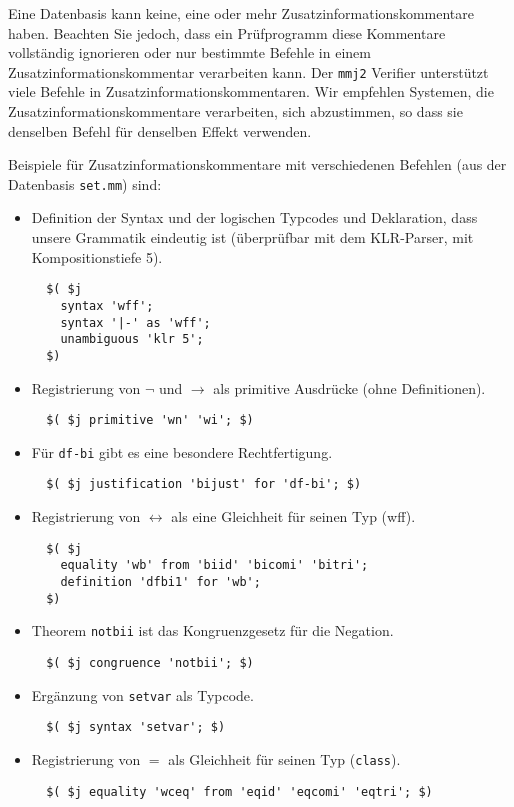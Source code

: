 Eine Datenbasis kann keine, eine oder mehr Zusatzinformationskommentare haben. Beachten Sie jedoch, dass ein Prüfprogramm diese Kommentare vollständig ignorieren oder nur bestimmte Befehle in einem Zusatzinformationskommentar verarbeiten kann. Der \texttt{mmj2} Verifier unterstützt viele Befehle in Zusatzinformationskommentaren. Wir empfehlen Systemen, die Zusatzinformationskommentare verarbeiten, sich abzustimmen, so dass sie denselben Befehl für denselben Effekt verwenden.

Beispiele für Zusatzinformationskommentare mit verschiedenen Befehlen (aus der Datenbasis \texttt{set.mm}) sind:

\begin{itemize}
   \item Definition der Syntax und der logischen Typcodes und Deklaration, dass unsere Grammatik eindeutig ist (überprüfbar mit dem KLR-Parser, mit Kompositionstiefe 5).
\begin{verbatim}
  $( $j
    syntax 'wff';
    syntax '|-' as 'wff';
    unambiguous 'klr 5';
  $)
\end{verbatim}

   \item Registrierung von $\lnot$ und $\rightarrow$ als primitive Ausdrücke (ohne Definitionen).
\begin{verbatim}
  $( $j primitive 'wn' 'wi'; $)
\end{verbatim}

   \item Für \texttt{df-bi} gibt es eine besondere Rechtfertigung.
\begin{verbatim}
  $( $j justification 'bijust' for 'df-bi'; $)
\end{verbatim}

   \item Registrierung von $\leftrightarrow$ als eine Gleichheit für seinen Typ (wff).
\begin{verbatim}
  $( $j
    equality 'wb' from 'biid' 'bicomi' 'bitri';
    definition 'dfbi1' for 'wb';
  $)
\end{verbatim}

   \item Theorem \texttt{notbii} ist das Kongruenzgesetz für die Negation.
\begin{verbatim}
  $( $j congruence 'notbii'; $)
\end{verbatim}

   \item Ergänzung von \texttt{setvar} als Typcode.
\begin{verbatim}
  $( $j syntax 'setvar'; $)
\end{verbatim}

   \item Registrierung von $=$ als Gleichheit für seinen Typ (\texttt{class}).
\begin{verbatim}
  $( $j equality 'wceq' from 'eqid' 'eqcomi' 'eqtri'; $)
\end{verbatim}

\end{itemize}



